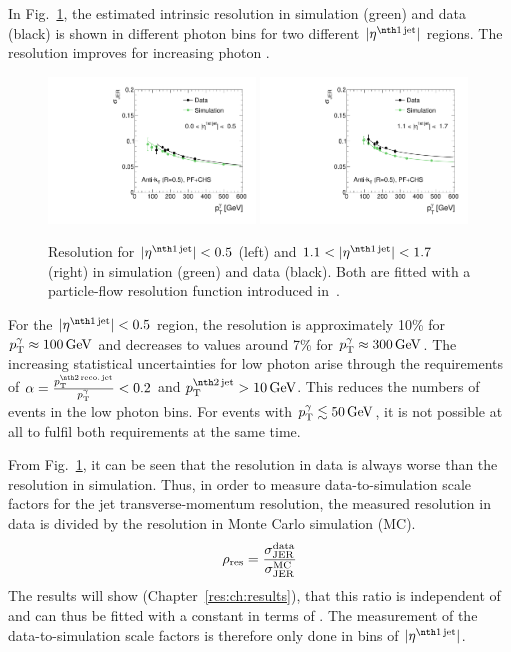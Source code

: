 In Fig.~\ref{fig:ResolutionOfPtgamma}, the estimated intrinsic resolution in simulation (green) and data (black) is shown in different photon \pt bins for two different $|\etafirstjet|$ regions.
The resolution improves for increasing photon \pt. 
\begin{figure}[!b]
  \centering
    \includegraphics[width=0.49\textwidth]{figures/resolution/methodology/Resolution_for_1_eta_bin_PFCHS_mc_RMS99.pdf}
    \includegraphics[width=0.49\textwidth]{figures/resolution/methodology/Resolution_for_3_eta_bin_PFCHS_mc_RMS99.pdf}
  \caption{Resolution for $|\etafirstjet| < 0.5$ (left) and $1.1<|\etafirstjet| < 1.7$ (right) in simulation (green) and data (black). Both are fitted with a particle-flow resolution function introduced in~\cite{bib:CMS:JERCPaper_2011}.}  
  \label{fig:ResolutionOfPtgamma}
\end{figure}
For the $|\etafirstjet|<0.5$ region, the resolution is approximately 10\% for $p_{\text{T}}^{\gamma} \approx 100\,\text{Ge}\kern-0.06667em\text{V}$ and decreases to values around 7\% for $p_{\text{T}}^{\gamma} \approx 300\,\text{Ge}\kern-0.06667em\text{V}$.
The increasing statistical uncertainties for low photon \pt arise through the requirements of $\alpha=\frac{\ptsecondrecojet}{\ptgamma}<0.2$ and $\ptsecondjet>10\gev$. 
This reduces the numbers of events in the low photon \pt bins. 
For events with ${p}_\mathrm{T}^{\gamma} \lesssim 50\,\text{Ge}\kern-0.06667em\text{V}$, it is not possible at all to fulfil both requirements at the same time.

From Fig.~\ref{fig:ResolutionOfPtgamma}, it can be seen that the resolution in data is always worse than the resolution in simulation.
Thus, in order to measure data-to-simulation scale factors \rhores for the jet transverse-momentum resolution, the measured resolution in data is divided by the resolution in Monte Carlo simulation (MC).
\begin{equation}
\label{res:eq:rhores}
\rho_\mathrm{res} = \frac{\sigma_\mathrm{JER}^{\text{data}}}{\sigma_\mathrm{JER}^{\text{MC}}}
\end{equation}
The results will show (Chapter~\ref{res:ch:results}), that this ratio is independent of \ptgamma and can thus be fitted with a constant in terms of \ptgamma.
The measurement of the data-to-simulation scale factors is therefore only done in bins of $|\etafirstjet|$.

